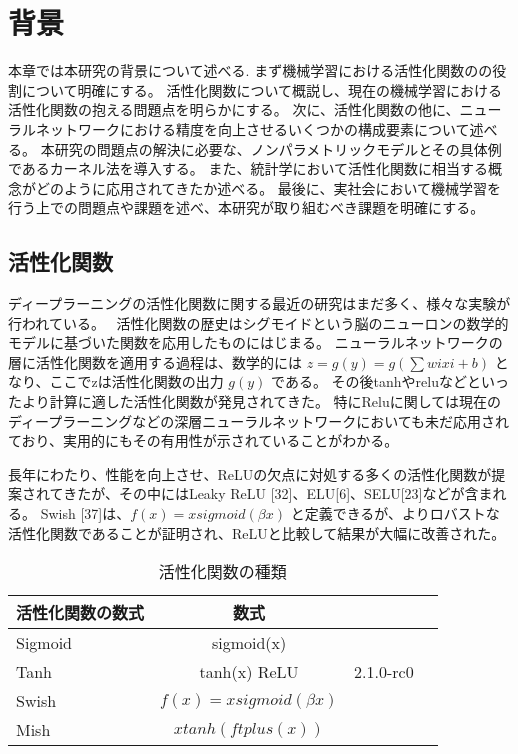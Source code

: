 \chapter{背景}
\label{background}

本章では本研究の背景について述べる.
まず機械学習における活性化関数のの役割について明確にする。
活性化関数について概説し、現在の機械学習における活性化関数の抱える問題点を明らかにする。
次に、活性化関数の他に、ニューラルネットワークにおける精度を向上させるいくつかの構成要素について述べる。
本研究の問題点の解決に必要な、ノンパラメトリックモデルとその具体例であるカーネル法を導入する。
また、統計学において活性化関数に相当する概念がどのように応用されてきたか述べる。
最後に、実社会において機械学習を行う上での問題点や課題を述べ、本研究が取り組むべき課題を明確にする。



\section{活性化関数}

ディープラーニングの活性化関数に関する最近の研究はまだ多く、様々な実験が 行われている。~\cite{af_list}
活性化関数の歴史はシグモイドという脳のニューロンの数学的モデルに基づいた関数を応用したものにはじまる。
ニューラルネットワークの層に活性化関数を適用する過程は、数学的には $ z=g(y)=g(\sum wixi+b) $ となり、ここでzは活性化関数の出力 $ g(y) $ である。
その後tanhやreluなどといったより計算に適した活性化関数が発見されてきた。
特にReluに関しては現在のディープラーニングなどの深層ニューラルネットワークにおいても未だ応用されており、実用的にもその有用性が示されていることがわかる。

長年にわたり、性能を向上させ、ReLUの欠点に対処する多くの活性化関数が提案されてきたが、その中にはLeaky ReLU [32]、ELU[6]、SELU[23]などが含まれる。
Swish [37]は、$ f(x)=xsigmoid(\beta x) $ と定義できるが、よりロバストな活性化関数であることが証明され、ReLUと比較して結果が大幅に改善された。



\begin{table}[htbp]
    \caption{活性化関数の種類}
    \begin{tabular}{l*{2}{c}r}
    活性化関数の数式              & 数式 \\
    \hline
    Sigmoid            & sigmoid(x) \\
    Tanh               & tanh(x)
    ReLU        & 2.1.0-rc0 \\
    Swish           & $ f(x)= xsigmoid(\beta x) $ \\
    Mish           & $ xtanh(f t plus(x)) $ \\

    \end{tabular}
\end{table}




